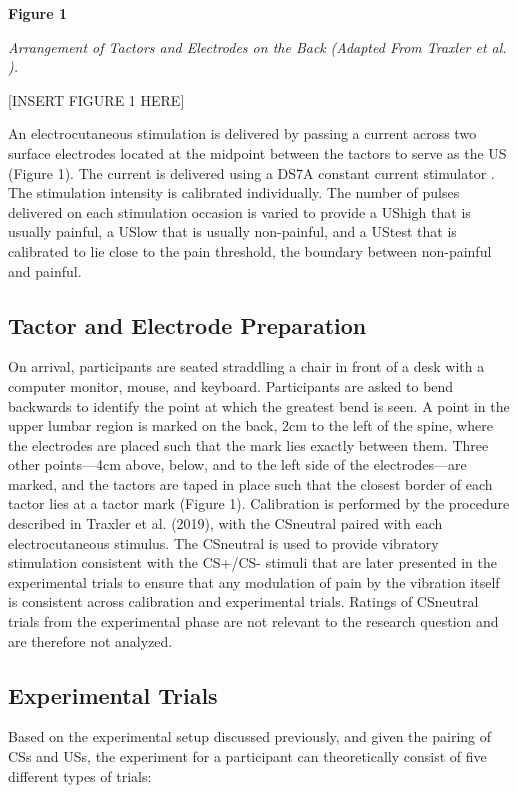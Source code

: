 \documentclass{article}
\begin{document}
\textbf{Figure 1}

\emph{Arrangement of Tactors and Electrodes on the Back}\emph{ }\emph{(Adapted From Traxler et al. }\autocite{bib57}\emph{)}\emph{.}

[INSERT FIGURE 1 HERE]

An electrocutaneous stimulation is delivered by passing a current across two surface electrodes located at the midpoint between the tactors to serve as the US (Figure 1). The current is delivered using a DS7A constant current stimulator \autocite{bib58}. The stimulation intensity is calibrated individually. The number of pulses delivered on each stimulation occasion is varied to provide a UShigh that is usually painful, a USlow that is usually non-painful, and a UStest that is calibrated to lie close to the pain threshold, the boundary between non-painful and painful.

\subsection{Tactor and Electrode Preparation}

On arrival, participants are seated straddling a chair in front of a desk with a computer monitor, mouse, and keyboard. Participants are asked to bend backwards to identify the point at which the greatest bend is seen. A point in the upper lumbar region is marked on the back, 2cm to the left of the spine, where the electrodes are placed such that the mark lies exactly between them. Three other points—4cm above, below, and to the left side of the electrodes—are marked, and the tactors are taped in place such that the closest border of each tactor lies at a tactor mark (Figure 1). Calibration is performed by the procedure described in Traxler et al. (2019), with the CSneutral paired with each electrocutaneous stimulus. The CSneutral is used to provide vibratory stimulation consistent with the CS+/CS- stimuli that are later presented in the experimental trials to ensure that any modulation of pain by the vibration itself is consistent across calibration and experimental trials. Ratings of CSneutral trials from the experimental phase are not relevant to the research question and are therefore not analyzed.

\subsection{Experimental Trials}

Based on the experimental setup discussed previously, and given the pairing of CSs and USs, the experiment for a participant can theoretically consist of five different types of trials:
\end{document}
